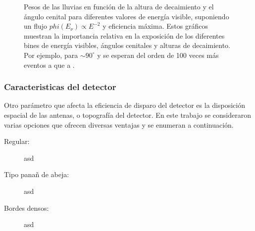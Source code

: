 \begin{figure}[ht!]
		\caption{\label{fig:radioShWeights}
		Pesos de las lluvias en funci\'on de la altura de decaimiento y el \'angulo cenital para diferentes valores de energ\'ia visible, suponiendo un flujo $phi(E_\nu)\propto E^{-2}$ y eficiencia m\'axima.
		Estos gr\'aficos muestran la importancia relativa en la exposici\'on de los diferentes bines de energ\'ia visibles, \'angulos cenitales y alturas de decaimiento.
		Por ejemplo, para $\sim90^\circ$ y  se esperan del orden de 100 veces m\'as eventos a  que a .
		}
	\end{figure}
	
	\subsubsection{Caracteristicas del detector}
	
	Otro par\'ametro que afecta la eficiencia de disparo del detector es la disposici\'on espacial de las antenas, o topograf\'ia del detector.
	En este trabajo se consideraron varias opciones que ofrecen diversas ventajas y se enumeran a continuaci\'on.
	
	\begin{description}
	 \item[Regular:] asd
	 \item[Tipo pana\~n de abeja:] asd
	 \item[Bordes densos:] asd
	\end{description}
	
	
	
